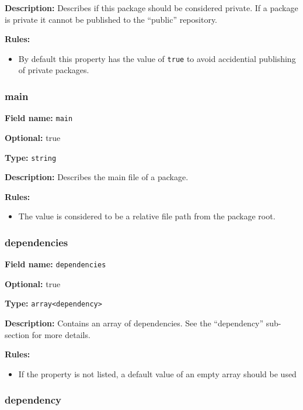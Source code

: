 \textbf{Description:} Describes if this package should be considered
private. If a package is private it cannot be published to the
``public'' repository.

\textbf{Rules:}

\begin{itemize}
\tightlist
\item
  By default this property has the value of \texttt{true} to avoid
  accidential publishing of private packages.
\end{itemize}

\hypertarget{main}{\subsubsection{main}\label{main}}

\textbf{Field name:} \texttt{main}

\textbf{Optional:} true

\textbf{Type:} \texttt{string}

\textbf{Description:} Describes the main file of a package.

\textbf{Rules:}

\begin{itemize}
\tightlist
\item
  The value is considered to be a relative file path from the package
  root.
\end{itemize}

\hypertarget{dependencies}{\subsubsection{dependencies}\label{dependencies}}

\textbf{Field name:} \texttt{dependencies}

\textbf{Optional:} true

\textbf{Type:} \texttt{array\textless{}dependency\textgreater{}}

\textbf{Description:} Contains an array of dependencies. See the
``dependency'' sub-section for more details.

\textbf{Rules:}

\begin{itemize}
\tightlist
\item
  If the property is not listed, a default value of an empty array
  should be used
\end{itemize}

\hypertarget{dependency}{\subsubsection{dependency}\label{dependency}}

